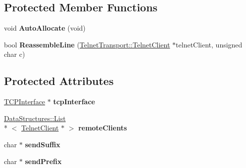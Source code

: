 \subsection*{Protected Member Functions}
\begin{DoxyCompactItemize}
\item 
\hypertarget{class_rak_net_1_1_telnet_transport_a61cb26a18d8f0ba64b2a783b22bf1392}{void {\bfseries Auto\-Allocate} (void)}\label{class_rak_net_1_1_telnet_transport_a61cb26a18d8f0ba64b2a783b22bf1392}

\item 
\hypertarget{class_rak_net_1_1_telnet_transport_a21a5624e1b31ebe6791869775e348d50}{bool {\bfseries Reassemble\-Line} (\hyperlink{struct_rak_net_1_1_telnet_transport_1_1_telnet_client}{Telnet\-Transport\-::\-Telnet\-Client} $\ast$telnet\-Client, unsigned char c)}\label{class_rak_net_1_1_telnet_transport_a21a5624e1b31ebe6791869775e348d50}

\end{DoxyCompactItemize}
\subsection*{Protected Attributes}
\begin{DoxyCompactItemize}
\item 
\hypertarget{class_rak_net_1_1_telnet_transport_a1544ac0615d7e078116d654277cec6d6}{\hyperlink{class_rak_net_1_1_t_c_p_interface}{T\-C\-P\-Interface} $\ast$ {\bfseries tcp\-Interface}}\label{class_rak_net_1_1_telnet_transport_a1544ac0615d7e078116d654277cec6d6}

\item 
\hypertarget{class_rak_net_1_1_telnet_transport_a4d7961d7b6ecba6be3f766c55c49c94a}{\hyperlink{class_data_structures_1_1_list}{Data\-Structures\-::\-List}\\*
$<$ \hyperlink{struct_rak_net_1_1_telnet_transport_1_1_telnet_client}{Telnet\-Client} $\ast$ $>$ {\bfseries remote\-Clients}}\label{class_rak_net_1_1_telnet_transport_a4d7961d7b6ecba6be3f766c55c49c94a}

\item 
\hypertarget{class_rak_net_1_1_telnet_transport_a2185ea993b999834089d7871676433eb}{char $\ast$ {\bfseries send\-Suffix}}\label{class_rak_net_1_1_telnet_transport_a2185ea993b999834089d7871676433eb}

\item 
\hypertarget{class_rak_net_1_1_telnet_transport_a822b38befb361068c6bbd4d15d65f1b7}{char $\ast$ {\bfseries send\-Prefix}}\label{class_rak_net_1_1_telnet_transport_a822b38befb361068c6bbd4d15d65f1b7}

\end{DoxyCompactItemize}


